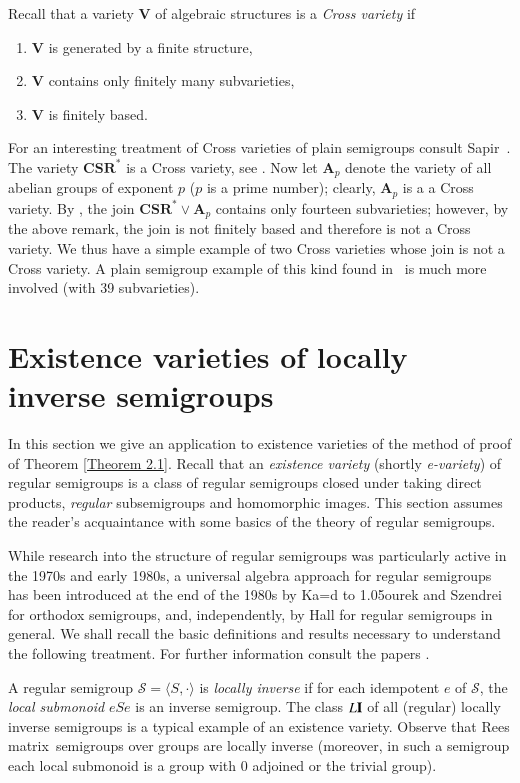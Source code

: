 \documentclass[preprint,1p,times]{elsarticle}
\numberwithin{equation}{section}
\theoremstyle{remark}
\def\softd{{\leavevmode\setbox1=\hbox{d}%
     \hbox to 1.05\wd1{d\kern-0.4ex{\char039}\hss}}}
\def\pv#1{{\bf #1}}
\def\Vc{\mathbf{V}}
\def\Rm{Rees matrix}
\begin{document}
Recall that a variety $\Vc$ of algebraic structures is a \emph{Cross variety} if
\renewcommand{\labelenumi}{\theenumi)}
\begin{enumerate}
\item $\Vc$ is generated by a finite structure,
\item $\Vc$ contains only finitely many subvarieties,
\item $\Vc$ is finitely based.
\end{enumerate}
For an interesting treatment of Cross varieties of plain semigroups consult Sapir~\cite{S}. The variety
$\mathbf{CSR^*}$ is a Cross variety, see \cite[Theorems 5.1 and 5.2, Corollary 5.4]{A1}. Now let $\mathbf{A}_p$ denote
the variety of all abelian groups of exponent $p$ ($p$ is a prime number); clearly, $\mathbf{A}_p$ is a a Cross
variety. By \cite[Corollaries 5.4 and 6.5]{A1}, the join $\mathbf{CSR^*}\vee\mathbf{A}_p$ contains only fourteen
subvarieties; however, by the above remark, the join is not finitely based and therefore is not a Cross variety. We
thus have a simple example of two Cross varieties whose join is not a Cross variety. A plain semigroup example of this
kind found in~\cite[Corollary 2.1]{S} is much more involved (with 39 subvarieties).

\section{Existence varieties of locally inverse semigroups}

In this section we give an application to existence varieties of the method of proof of Theorem \ref{Theorem 2.1}.
Recall that an \emph{existence variety} (shortly \emph{e-variety}) of regular semigroups is a class of regular
semigroups closed under taking direct products, \emph{regular} subsemigroups and homomorphic images. This section
assumes the reader's acquaintance with some basics of the theory of regular semigroups.

While research into the structure of regular semigroups was particularly active in the 1970s and early 1980s, a
universal algebra approach for regular semigroups has been introduced at the end of the 1980s by {Ka\softd{}ourek} and
Szendrei \cite{KS} for orthodox semigroups, and, independently, by Hall \cite{H1,H2} for regular semigroups in general.
We shall recall the basic definitions and results necessary to understand the following treatment. For further
information consult the papers \cite{KS,H1,H2,Y1,A2,A3}.

A regular semigroup $\mathcal{S}=\langle S,\cdot\rangle$ is \emph{locally inverse} if for each idempotent $e$ of
$\mathcal S$, the \emph{local submonoid} $eSe$ is an inverse semigroup. The class $L\pv I$ of all (regular) locally
inverse semigroups is a typical example of an existence variety. Observe that \Rm\ semigroups over groups are locally
inverse (moreover, in such a semigroup each local submonoid is a group with 0 adjoined or the trivial group).
\end{document}
